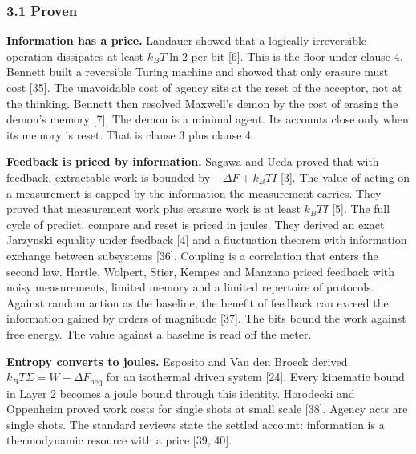\documentclass[
  10pt,
]{article}
\begin{document}
\subsubsection{3.1 Proven}\label{proven}

\textbf{Information has a price.} Landauer showed that a logically
irreversible operation dissipates at least \(k_B T \ln 2\) per bit
{[}6{]}. This is the floor under clause 4. Bennett built a reversible
Turing machine and showed that only erasure must cost {[}35{]}. The
unavoidable cost of agency sits at the reset of the acceptor, not at the
thinking. Bennett then resolved Maxwell's demon by the cost of erasing
the demon's memory {[}7{]}. The demon is a minimal agent. Its accounts
close only when its memory is reset. That is clause 3 plus clause 4.

\textbf{Feedback is priced by information.} Sagawa and Ueda proved that
with feedback, extractable work is bounded by \(-\Delta F + k_B T I\)
{[}3{]}. The value of acting on a measurement is capped by the
information the measurement carries. They proved that measurement work
plus erasure work is at least \(k_B T I\) {[}5{]}. The full cycle of
predict, compare and reset is priced in joules. They derived an exact
Jarzynski equality under feedback {[}4{]} and a fluctuation theorem with
information exchange between subsystems {[}36{]}. Coupling is a
correlation that enters the second law. Hartle, Wolpert, Stier, Kempes
and Manzano priced feedback with noisy measurements, limited memory and
a limited repertoire of protocols. Against random action as the
baseline, the benefit of feedback can exceed the information gained by
orders of magnitude {[}37{]}. The bits bound the work against free
energy. The value against a baseline is read off the meter.

\textbf{Entropy converts to joules.} Esposito and Van den Broeck derived
\(k_B T \Sigma = W - \Delta F_{\mathrm{neq}}\) for an isothermal driven
system {[}24{]}. Every kinematic bound in Layer 2 becomes a joule bound
through this identity. Horodecki and Oppenheim proved work costs for
single shots at small scale {[}38{]}. Agency acts are single shots. The
standard reviews state the settled account: information is a
thermodynamic resource with a price {[}39, 40{]}.
\end{document}

